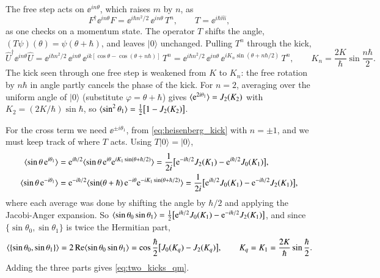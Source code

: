 The free step acts on $\ee^{in\theta}$, which raises $m$ by $n$, as
\begin{equation}
  F^\dagger\ee^{in\theta}F = \ee^{i\hbar n^2/2}\,\ee^{in\theta}\,T^n, \qquad T = \ee^{i\hbar\hat m},
\end{equation}
as one checks on a momentum state. The operator $T$ shifts the angle, $(T\psi)(\theta) = \psi(\theta + \hbar)$,
and leaves $|0\rangle$ unchanged. Pulling $T^n$ through the kick,
\begin{equation}
  \hat U^\dagger\ee^{in\theta}\hat U
  = \ee^{i\hbar n^2/2}\,\ee^{in\theta}\,\ee^{ik[\cos\theta - \cos(\theta + n\hbar)]}\,T^n
  = \ee^{i\hbar n^2/2}\,\ee^{in\theta}\,\ee^{iK_n\sin(\theta + n\hbar/2)}\,T^n,
  \qquad K_n = \frac{2K}{\hbar}\sin\frac{n\hbar}{2}.
  \label{eq:heisenberg_kick}
\end{equation}
The kick seen through one free step is weakened from $K$ to $K_n$: the free rotation by $n\hbar$ in angle
partly cancels the phase of the kick. For $n = 2$, averaging over the uniform angle of $|0\rangle$ (substitute
$\varphi = \theta + \hbar$) gives $\langle \mathrm{e}^{2i\theta_1} \rangle = J_2(K_2)$ with $K_2 = (2K/\hbar)\sin\hbar$, so
$\langle \sin^2\theta_1 \rangle = \tfrac12\bigl[1 - J_2(K_2)\bigr]$.

For the cross term we need $\ee^{\pm i\theta_1}$, from \cref{eq:heisenberg_kick} with $n = \pm1$, and we
must keep track of where $T$ acts. Using $T|0\rangle = |0\rangle$,
\begin{align}
  \langle \sin\theta\,\mathrm{e}^{i\theta_1} \rangle &= \mathrm{e}^{i\hbar/2}\langle \sin\theta\,\mathrm{e}^{i\theta}\mathrm{e}^{iK_1\sin(\theta + \hbar/2)} \rangle
  = \frac{1}{2i}\bigl[\mathrm{e}^{-i\hbar/2}J_2(K_1) - \mathrm{e}^{i\hbar/2}J_0(K_1)\bigr],\\
  \langle \sin\theta\,\mathrm{e}^{-i\theta_1} \rangle &= \mathrm{e}^{-i\hbar/2}\langle \sin(\theta + \hbar)\,\mathrm{e}^{-i\theta}\mathrm{e}^{-iK_1\sin(\theta + \hbar/2)} \rangle
  = \frac{1}{2i}\bigl[\mathrm{e}^{i\hbar/2}J_0(K_1) - \mathrm{e}^{-i\hbar/2}J_2(K_1)\bigr],
\end{align}
where each average was done by shifting the angle by $\hbar/2$ and applying the Jacobi-Anger expansion. So
$\langle \sin\theta_0\sin\theta_1 \rangle = \tfrac12\bigl[\mathrm{e}^{i\hbar/2}J_0(K_1) - \mathrm{e}^{-i\hbar/2}J_2(K_1)\bigr]$, and
since $\{\sin\theta_0, \sin\theta_1\}$ is twice the Hermitian part,
\begin{equation}
  \langle \{\sin\theta_0, \sin\theta_1\} \rangle = 2\,\mathrm{Re}\langle \sin\theta_0\sin\theta_1 \rangle
  = \cos\frac{\hbar}{2}\bigl[J_0(K_q) - J_2(K_q)\bigr], \qquad K_q = K_1 = \frac{2K}{\hbar}\sin\frac{\hbar}{2}.
\end{equation}
Adding the three parts gives \cref{eq:two_kicks_qm}.

